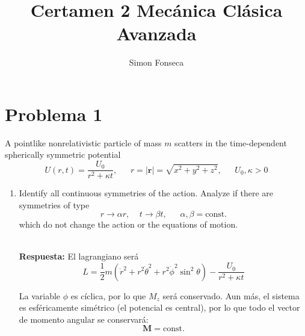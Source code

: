 \documentclass[]{article}
\title{Certamen 2 Mecánica Clásica Avanzada}
\author{Simon Fonseca}
\numberwithin{equation}{section}
\newcommand{\0}{\textcolor{gray}{0}}
\newcommand{\n}[1]{\mathbf{#1}}
\newcommand{\resp}{
	\\
	
	\textbf{Respuesta:} }
\begin{document}
\maketitle
\section{Problema 1}
A pointlike nonrelativistic particle of mass $m$ scatters in the time-dependent spherically symmetric potential
\begin{equation}
	U(r,t) = \frac{U_0}{r^2 + \kappa t}, ~~~~~~~ r = |\n{r}| = \sqrt{x^2 + y^2 + z^2}, ~~~~~~~ U_0, \kappa > 0 \label{eq:1.1}
\end{equation}

\begin{enumerate}
	\item[(a)] Identify all continuous symmetries of the action. Analyze if there are symmetries of type
	\begin{equation}
		r \rightarrow \alpha r, ~~~~~ t \rightarrow \beta t, ~~~~~~~ \alpha, \beta = \mathrm{const.}
	\end{equation}
	which do not change the action or the equations of motion.
	\resp  El lagrangiano será
	\begin{equation}
		L = \frac{1}{2}m \left(\dot{r}^2 + r^2 \dot{\theta}^2 + r^2\dot{\phi}^2 \sin^2 \theta \right) - \frac{U_0}{r^2 + \kappa t}
	\end{equation}
	
	La variable $\phi$ es cíclica, por lo que $M_z$ será conservado. Aun más, el sistema es esféricamente simétrico (el potencial es central), por lo que todo el vector de momento angular se conservará:
	\begin{equation}
		\n{M} = \mathrm{const.}
	\end{equation}
	

\end{enumerate}
\end{document}

